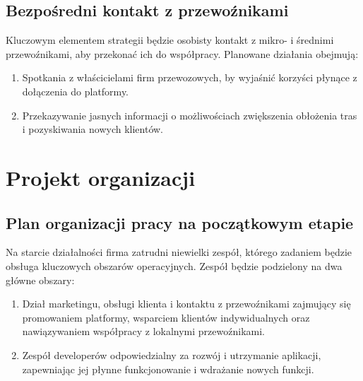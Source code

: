     \subsection{Bezpośredni kontakt z przewoźnikami}
    Kluczowym elementem strategii będzie osobisty kontakt z mikro- i średnimi przewoźnikami, aby przekonać ich do współpracy. Planowane działania obejmują:
    \begin{enumerate}
        \item Spotkania z właścicielami firm przewozowych, by wyjaśnić korzyści płynące z dołączenia do platformy.
        \item Przekazywanie jasnych informacji o możliwościach zwiększenia obłożenia tras i pozyskiwania nowych klientów.
    \end{enumerate}

\section{Projekt organizacji}

    \subsection {Plan organizacji pracy na początkowym etapie}
    Na starcie działalności firma zatrudni niewielki zespół, którego zadaniem będzie obsługa kluczowych obszarów operacyjnych. Zespół będzie podzielony na dwa główne obszary:
    \begin{enumerate}
        \item Dział marketingu, obsługi klienta i kontaktu z przewoźnikami zajmujący się promowaniem platformy, wsparciem klientów indywidualnych oraz nawiązywaniem współpracy z lokalnymi przewoźnikami.
        \item Zespół developerów odpowiedzialny za rozwój i utrzymanie aplikacji, zapewniając jej płynne funkcjonowanie i wdrażanie nowych funkcji.
    \end{enumerate}
    
